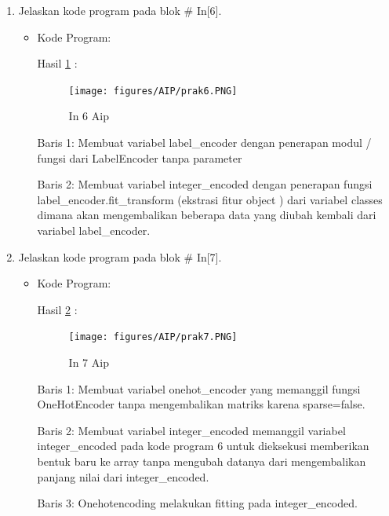\begin{enumerate}
\item Jelaskan kode program pada blok \# In[6].
\begin{itemize}
\item Kode Program:

\par Hasil \ref{in6aip} :
\begin{figure}[!hbtp]
\centering
\texttt{[image: figures/AIP/prak6.PNG]}
\caption{In 6 Aip}
\label{in6aip}
\end{figure}
\par Baris 1: Membuat variabel label\_encoder dengan penerapan modul / fungsi dari LabelEncoder tanpa parameter
\par Baris 2: Membuat variabel integer\_encoded dengan penerapan fungsi label\_encoder.fit\_transform (ekstrasi fitur object ) dari variabel classes dimana akan mengembalikan beberapa data yang diubah kembali dari variabel label\_encoder.
\end{itemize}
\par

\item Jelaskan kode program pada blok \# In[7].
\begin{itemize}
\item Kode Program:

\par Hasil \ref{in7aip} :
\begin{figure}[!hbtp]
\centering
\texttt{[image: figures/AIP/prak7.PNG]}
\caption{In 7 Aip}
\label{in7aip}
\end{figure}
\par Baris 1: Membuat variabel onehot\_encoder yang memanggil fungsi OneHotEncoder tanpa mengembalikan matriks karena sparse=false.
\par Baris 2: Membuat variabel integer\_encoded memanggil variabel integer\_encoded pada kode program 6 untuk dieksekusi memberikan bentuk baru ke array tanpa mengubah datanya dari mengembalikan panjang nilai dari integer\_encoded.
\par Baris 3: Onehotencoding melakukan fitting pada integer\_encoded.
\end{itemize}
\par


\end{enumerate}
